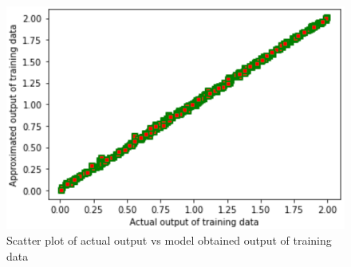 \documentclass[10pt,a4paper]{article}
\begin{document}
\begin{figure}[htbp]
    \centering
    \includegraphics[width=0.8\linewidth]{Scatt.png}
    \captionsetup{justification=centering}
    \caption{Scatter plot of actual output vs model obtained output of training data}
\end{figure}
\end{document}
